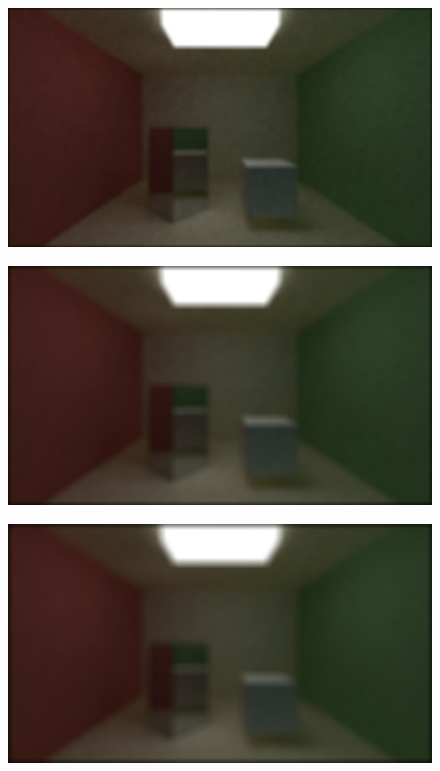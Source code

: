 \documentclass[titlepage,12pt]{report}
\begin{document}
\begin{appendices}
\begin{figure}[H]
	\centering
  	\includegraphics[scale=0.5]{media/mean/cornell_normal_50_mean_filter_11.png}
  	\label{ap6}
\end{figure}

\begin{figure}[H]
	\centering
  	\includegraphics[scale=0.5]{media/mean/cornell_normal_50_mean_filter_17.png}
  	\label{ap7}
\end{figure}

\begin{figure}[H]
	\centering
  	\includegraphics[scale=0.5]{media/mean/cornell_normal_50_mean_filter_21.png}
  	\label{ap8}
\end{figure}



\end{appendices}
\end{document}
